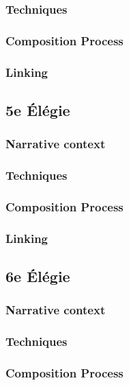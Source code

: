 \documentclass[12pt,twoside,maitrise]{dms}
\theoremstyle{definition}
\begin{document}
\subsubsection{Techniques}

\subsubsection{Composition Process}

\subsubsection{Linking}

\subsection{5e Élégie}

\subsubsection{Narrative context}

\subsubsection{Techniques}

\subsubsection{Composition Process}

\subsubsection{Linking}

\subsection{6e Élégie}

\subsubsection{Narrative context}

\subsubsection{Techniques}

\subsubsection{Composition Process}
\end{document}
